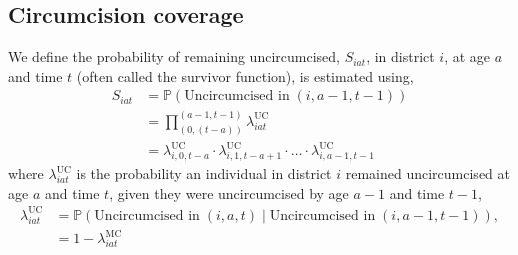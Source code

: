 \documentclass{article}
\begin{document}
\begin{appendix}

\subsection{Circumcision coverage}
\label{sec::coverage}


We define the probability of remaining uncircumcised, $S_{iat}$, in district $i$, at age $a$ and time $t$ (often called the survivor function), is estimated using, 
\begin{equation*}
	\begin{split}
		S_{iat} &= \mathbb{P}(\text{Uncircumcised in} \; (i,a-1,t-1)) \\
				&= \prod_{(0,(t-a))}^{(a-1,t-1)}\lambda^{\text{UC}}_{iat} \\
				&= \lambda^{\text{UC}}_{i,0,t-a}\cdot \lambda^{\text{UC}}_{i,1,t-a+1}\cdot\ldots \cdot\lambda^{\text{UC}}_{i,a-1,t-1}
	\end{split}
	\label{eqn::survfunc}
\end{equation*}
where $\lambda^{\text{UC}}_{iat}$ is the probability an individual in district $i$ remained uncircumcised at age $a$ and time $t$, given they were uncircumcised by age $a-1$ and time $t-1$,
\begin{equation*}
	\begin{split}
		\lambda^{\text{UC}}_{iat} &= \mathbb{P}(\text{Uncircumcised in}  \; (i,a,t) \; | \; \text{Uncircumcised in} \; (i,a-1, t-1)),\\
		&= 1 - \lambda^{\text{MC}}_{iat} 
	\end{split}
	\label{eqn::uncirc}
\end{equation*}


\end{appendix}
\end{document}
